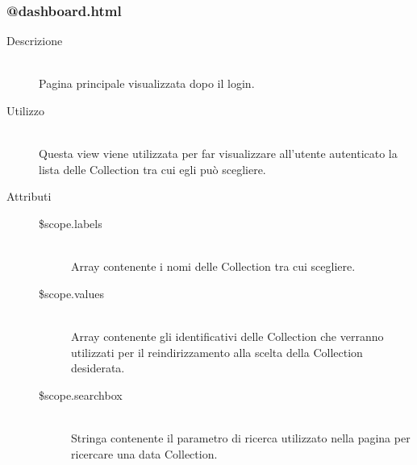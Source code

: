 \subsubsection{@dashboard.html}
\begin{description}
	\item[Descrizione] \hfill \\
	Pagina principale visualizzata dopo il login.
	\item[Utilizzo] \hfill \\
	Questa view viene utilizzata per far visualizzare all'utente autenticato la lista delle Collection tra cui egli può scegliere.
	\item[Attributi] \hfill
	\begin{description}
		\item[\$scope.labels] \hfill \\
		Array contenente i nomi delle Collection tra cui scegliere.
		\item[\$scope.values] \hfill \\
		Array contenente gli identificativi delle Collection che verranno utilizzati per il reindirizzamento alla scelta della Collection desiderata.
		\item[\$scope.searchbox] \hfill \\
		Stringa contenente il parametro di ricerca utilizzato nella pagina per ricercare una data Collection.
		
	\end{description}
 	
\end{description}

